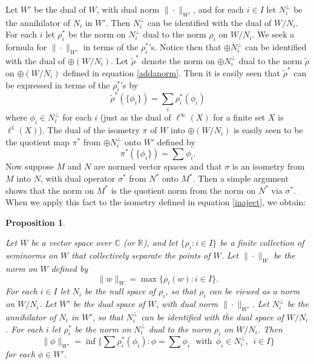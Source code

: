 \documentclass{amsart}[14pt]
\newtheorem{proposition}[theorem]{Proposition}
\theoremstyle{definition}
\theoremstyle{remark}
\newcommand{\bC}{{\mathbb C}}
\newcommand{\bR}{{\mathbb R}}
\newcommand{\s}{\sigma}
\newcommand{\<}{\langle}
\renewcommand{\>}{\rangle}
\numberwithin{equation}{section}
\begin{document}
{Let $W'$ be the dual of $W$, with dual norm $\|\cdot\|_{W'}$,
and for each $i \in I$ let $N_i^\perp$ be the
annihilator of $N_i$ in $W'$. Then $N_i^\perp$ can be identified with
the dual of $W/N_i$. For each $i$ let $\rho_i^*$ be the norm on 
$N_i^\perp$  dual to the norm 
$\rho_i$ on $W/N_i $. We seek a formula for $\|\cdot\|_{W'}$
in terms of the $\rho_i^* $'s.
Notice then that $\oplus N_i^\perp$ can be identified with
the dual of $\oplus (W/N_i) $.
Let $\tilde \rho^*$ denote the norm on $\oplus N_i^\perp$ dual to the 
norm $\tilde \rho$ on $\oplus (W/N_i) $
defined in equation \eqref{addanorm}.
Then it is easily seen that
$\tilde \rho^*$ can be expressed in terms of the $\rho_i^*$'s by
\[
\tilde \rho^*(\{\phi_i\}) = \sum_i \rho_i^*(\phi_i)
\]
where $\phi_i \in N_i^\perp$ for each $i$ (just as the dual
of $\ell^\infty(X)$ for a finite set $X$ is $\ell^1(X)$).
The dual of the isometry $\pi $ of $W$ into $\oplus (W/N_i) $ is easily seen
to be the quotient map $\pi^*$ from $ \oplus N_i^\perp$ onto $W'$
defined by
\[
\pi^*(\{\phi_i\}) = \sum \phi_i  .
\]
Now suppose $M$ and $N$ are normed vector 
spaces and that $\s$ is an isometry
from $M$ into $N$, with dual operator $\s^*$ from $N^*$ onto $M^*$. 
Then a simple argument shows that the norm
on $M^*$ is the quotient norm from the norm on $N^*$ via $\s^*$.
 When we apply this fact to the isometry  
defined in equation \eqref{inaject}, we obtain:

\begin{proposition}
\label{dualanorm}

Let $W$ be a vector space over $\bC$ (or $\bR$), and let
$\{\rho_i: i \in I\}$ be a finite collection of seminorms on 
$ W $ that collectively separate the points of $ W $. Let 
$\|\cdot\|_W$ be the norm on $W $ defined by
\begin{equation}
\label{asumnorm}
\|w\|_W= \max \{\rho_i(w): i \in I\}.
\end{equation}
For each $i \in I $ let $N_i$
be the null space of $\rho_i $, so that $\rho_i $ can be viewed 
as a norm on $W/N_i $.
 Let $W'$ be the dual space of $W$, with dual norm $\|\cdot\|_{W'}$.
Let $N_i^\perp$ be the annihilator of $N_i$ in $W'$, so that
$N_i^\perp$ can be identified with the dual space of $W/N_i $.
For each $i$ let $\rho_i^*$ be the norm on 
$N_i^\perp$ dual to the norm 
$\rho_i$ on $W/N_i $. Then
\[
\|\phi\|_{W'} = \inf \{ \sum \rho^*_i(\phi_i) : \phi = \sum \phi_i\
\ \ \mathrm{with} \ \  \phi_i \in N_i^ \perp, \ \ i \in I \} 
\]
for each $\phi \in W'$.
\end{proposition}

}
\end{document}
